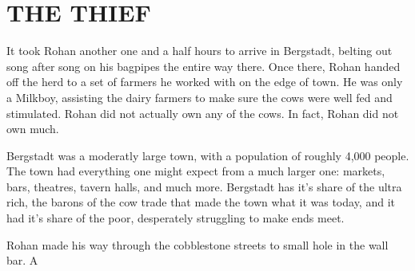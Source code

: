 \documentclass[ms,a4paper]{memoir}
\newcommand{\RED}[1]{\textcolor{red!50!black}{\MakeUppercase{#1}}}
\begin{document}
\chapter{\RED{The Thief}}

It took Rohan another one and a half hours to arrive in Bergstadt, belting out 
song after song on his bagpipes the entire way there. Once there, Rohan handed off the herd to 
a set of farmers he worked with on the edge of town. He was only a Milkboy, assisting 
the dairy farmers to make sure the cows were well fed and stimulated. Rohan did 
not actually own any of the cows. In fact, Rohan did not own much.

Bergstadt was a moderatly large town, with a population of roughly 4,000 people. The town 
had everything one might expect from a much larger one: markets, bars, theatres, tavern halls,
and much more. Bergstadt has it's share of the ultra rich, the barons of the cow trade that 
made the town what it was today, and it had it's share of the poor, desperately struggling 
to make ends meet.

Rohan made his way through the cobblestone streets to small hole in the wall bar. A
\end{document}

